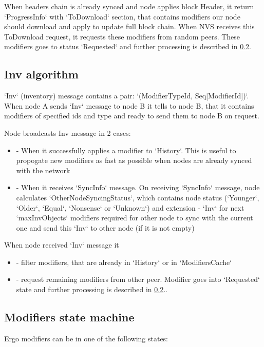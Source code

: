 When headers chain is already synced and node applies block Header, it return `ProgressInfo` with `ToDownload` section,
that contains modifiers our node should download and apply to update full block chain.
When NVS receives this ToDownload request, it requests these modifiers from random peers.
These modifiers goes to status `Requested` and further processing is described in \ref{sync:st}.

\subsection{Inv algorithm}
\label{sync:inv}

`Inv` (inventory) message contains a pair: `(ModifierTypeId, Seq[ModifierId])`. When node A sends `Inv` message
to node B it tells to node B, that it contains modifiers of specified ids and type and ready to send them to
node B on request.

Node broadcasts Inv message in 2 cases:
\begin{itemize}
    \item - When it successfully applies a modifier to `History`. This is useful to propogate new modifiers
    as fast as possible when nodes are already synced with the network
    \item - When it receives `SyncInfo` message. On receiving `SyncInfo` message, node calculates
    `OtherNodeSyncingStatus`, which contains node status (`Younger`, `Older`, `Equal`, `Nonsense` or `Unknown`)
    and extension - `Inv` for next `maxInvObjects` modifiers required for other node to sync with
    the current one and send this `Inv` to other node (if it is not empty)
\end{itemize}

When node received `Inv` message it
\begin{itemize}
    \item - filter modifiers, that are already in `History` or in `ModifiersCache`
    \item - request remaining modifiers from other peer. Modifier goes into `Requested` state
    and further processing is described in \ref{sync:st}..
\end{itemize}

\subsection{Modifiers state machine}
\label{sync:st}

Ergo modifiers can be in one of the following states:

